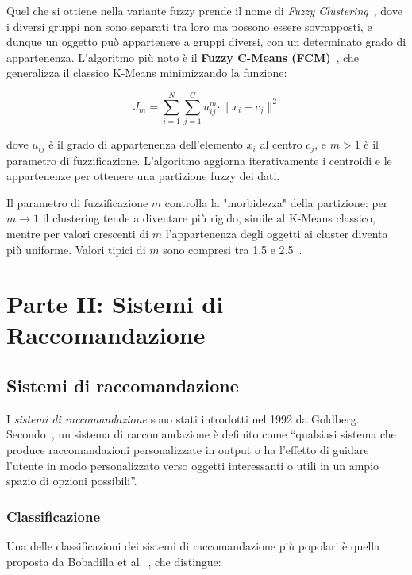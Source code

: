 Quel che si ottiene nella variante fuzzy prende il nome di \textit{Fuzzy Clustering}~\cite{dunn1973fuzzy}, dove i diversi gruppi non sono separati tra loro ma possono essere sovrapposti, e dunque un oggetto può appartenere a gruppi diversi, con un determinato grado di appartenenza. L’algoritmo più noto è il \textbf{Fuzzy C-Means (FCM)}~\cite{BEZDEK1984191}, che generalizza il classico K-Means minimizzando la funzione:

\[
J_m = \sum_{i=1}^{N} \sum_{j=1}^{C} u_{ij}^m \cdot \|x_i - c_j\|^2
\]

dove $u_{ij}$ è il grado di appartenenza dell’elemento $x_i$ al centro $c_j$, e $m > 1$ è il parametro di fuzzificazione. L’algoritmo aggiorna iterativamente i centroidi e le appartenenze per ottenere una partizione fuzzy dei dati.

Il parametro di fuzzificazione $m$ controlla la "morbidezza" della partizione: per $m \rightarrow 1$ il clustering tende a diventare più rigido, simile al K-Means classico, mentre per valori crescenti di $m$ l'appartenenza degli oggetti ai cluster diventa più uniforme. Valori tipici di $m$ sono compresi tra 1.5 e 2.5~\cite{BEZDEK1984191}.


\section{Parte II: Sistemi di Raccomandazione}

\subsection{Sistemi di raccomandazione}

I \textit{sistemi di raccomandazione} sono stati introdotti nel 1992 da Goldberg\cite{10.1145/138859.138867}. Secondo~\cite{burke2002hybrid}, un sistema di raccomandazione è definito come ``qualsiasi sistema che produce raccomandazioni personalizzate in output o ha l’effetto di guidare l’utente in modo personalizzato verso oggetti interessanti o utili in un ampio spazio di opzioni possibili''. 

\subsubsection{Classificazione}

Una delle classificazioni dei sistemi di raccomandazione più popolari è quella proposta da Bobadilla et al.~\cite{bobadilla2013recommender}, che distingue:

